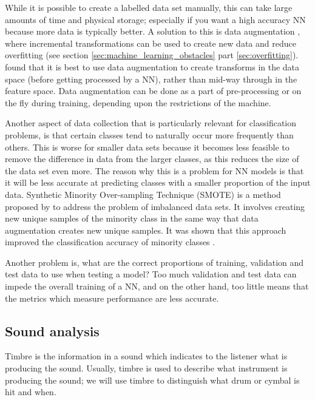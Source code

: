 \documentclass[12pt]{article}
\begin{document}
	While it is possible to create a labelled data set manually, this can take large amounts of time and physical storage; especially if you want a high accuracy NN because more data is typically better. A solution to this is data augmentation \parencite{gmsw2016}, where incremental transformations can be used to create new data and reduce overfitting (see section \ref{sec:machine_learning_obstacles} part  \ref{sec:overfitting}). \textcite{gmsw2016} found that it is best to use data augmentation to create transforms in the data space (before getting processed by a NN), rather than mid-way through in the feature space. Data augmentation can be done as a part of pre-processing or on the fly during training, depending upon the restrictions of the machine.\medskip
	
	Another aspect of data collection that is particularly relevant for classification problems, is that certain classes tend to naturally occur more frequently than others. This is worse for smaller data sets because it becomes less feasible to remove the difference in data from the larger classes, as this reduces the size of the data set even more. The reason why this is a problem for NN models is that it will be less accurate at predicting classes with a smaller proportion of the input data. Synthetic Minority Over-sampling Technique (SMOTE) is a method proposed by \textcite{Chawla2002} to address the problem of imbalanced data sets.
	It involves creating new unique samples of the minority class in the same way that data augmentation creates new unique samples. It was shown that this approach improved the classification accuracy of minority classes \parencite{Chawla2002}.\medskip
	
	Another problem is, what are the correct proportions of training, validation and test data to use when testing a model? Too much validation and test data can impede the overall training of a NN, and on the other hand, too little means that the metrics which measure performance are less accurate.\medskip
	
	\subsection{Sound analysis}
	\label{sec:sound_analysis}
	Timbre is the information in a sound which indicates to the listener what is producing the sound. Usually, timbre is used to describe what instrument is producing the sound; we will use timbre to distinguish what drum or cymbal is hit and when.\medskip
	
\end{document}
